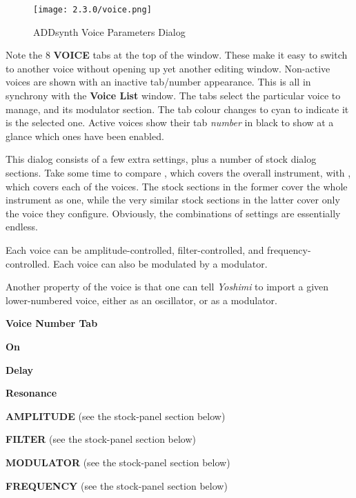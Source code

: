 \begin{figure}[H]
   \centering
   \texttt{[image: 2.3.0/voice.png]}
   \caption{ADDsynth Voice Parameters Dialog}
   \label{fig:addsynth_voice_parameters_dialog}
\end{figure}

   Note the 8 \textbf{VOICE} tabs at the top of the window.
   These make it easy to switch to another voice without opening up yet
   another editing window.
   Non-active voices are shown with an inactive tab/number appearance.
   This is all in synchrony with the \textbf{Voice List} window.
   The tabs select the particular voice to manage, and its modulator section.
   The tab colour changes to cyan to indicate it is the selected one.
   Active voices show their tab \textsl{number} in black to show
   at a glance which ones have been enabled.

   This dialog consists of a few extra settings, plus a number of
   stock dialog sections.  Take some time to compare
   ,
   which covers the overall instrument, with
   ,
   which covers each of the voices.
   The stock sections in the former cover the whole instrument as one,
   while the very similar stock sections in the latter cover only the
   voice they configure.
   Obviously, the combinations of settings are essentially endless.

   Each voice can be amplitude-controlled, filter-controlled, and
   frequency-controlled.  Each voice can also be modulated by a
   modulator.

  Another property of the voice is that one can tell \textsl{Yoshimi} to
  import a given lower-numbered voice, either as an oscillator, or as a
  modulator.

   \begin{enumber}
      \item \textbf{Voice Number Tab}
      \item \textbf{On}
      \item \textbf{Delay}
      \item \textbf{Resonance}
      \item \textbf{AMPLITUDE} (see the stock-panel section below)
      \item \textbf{FILTER} (see the stock-panel section below)
      \item \textbf{MODULATOR} (see the stock-panel section below)
      \item \textbf{FREQUENCY} (see the stock-panel section below)
   \end{enumber}

